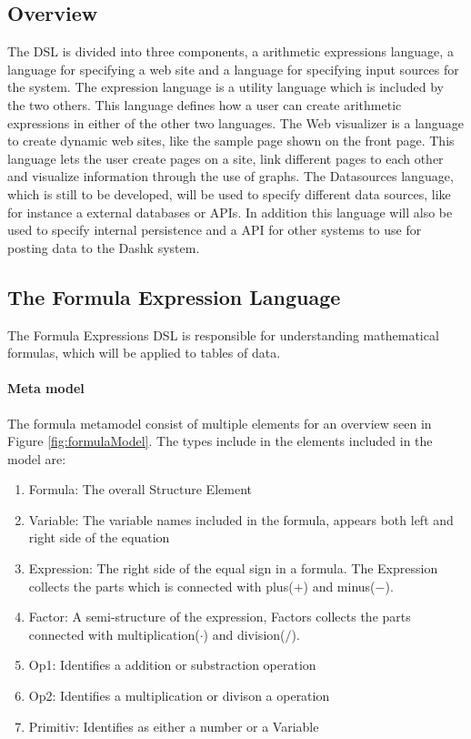 \subsection{Overview}
The DSL is divided into three components, a arithmetic expressions language, a language for specifying a web site and a language for specifying input sources for the system. 
The expression language is a utility language which is included by the two others. 
This language defines how a user can create arithmetic expressions in either of the other two languages. 
The Web visualizer is a language to create dynamic web sites, like the sample page shown on the front page. 
This language lets the user create pages on a site, link different pages to each other and visualize information through the use of graphs. 
The Datasources language, which is still to be developed, will be used to specify different data sources, like for instance a external databases or APIs. 
In addition this language will also be used to specify internal persistence and a API for other systems to use for posting data to the Dashk system.

\subsection{The Formula Expression Language}
The Formula Expressions DSL is responsible for understanding mathematical formulas, which will be applied to tables of data.
\paragraph{Meta model}

The formula metamodel consist of multiple elements for an overview seen in Figure
\ref{fig:formulaModel}. The types include in the elements included in the model are:
\begin{enumerate}
\item Formula: The overall Structure Element
\item Variable: The variable names included in the formula, appears both left and right side of the equation
\item Expression: The right side of the equal sign in a formula. The Expression collects the parts which is connected with plus($+$) and minus($-$). 
\item Factor: A semi-structure of the expression, Factors collects the parts connected with multiplication($\cdot$) and division($/$).
\item Op1: Identifies a addition or substraction operation
\item Op2: Identifies a multiplication or divison a operation
\item Primitiv: Identifies as either a number or a Variable
\end{enumerate}

